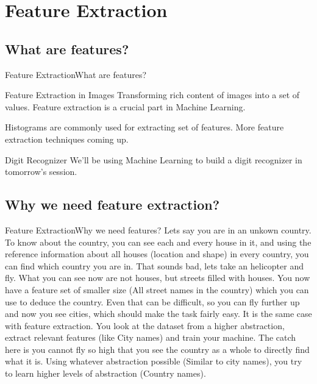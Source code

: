 \documentclass{beamer}
\begin{document}
\section{Feature Extraction}
\subsection{What are features?}
\begin{frame}{Feature Extraction}{What are features?}
\begin{block}{Feature Extraction in Images}
Transforming rich content of images into a set of values. Feature extraction is a crucial part in Machine Learning.
\end{block}
\pause
\begin{example}
Histograms are commonly used for extracting set of features. More feature extraction techniques coming up.
\end{example}

\pause
\begin{block}{Digit Recognizer}
We'll be using Machine Learning to build a digit recognizer in tomorrow's session. 
\end{block}

\end{frame}

\subsection{Why we need feature extraction?}
\begin{frame}{Feature Extraction}{Why we need features?}
Lets say you are in an unkown country. 
To know about the country, you can see each and every house in it, and using the reference information about all houses (location and shape) in every country, you can find which country you are in.
That sounds bad, lets take an helicopter and fly. What you can see now are not houses, but streets filled with houses. You now have a feature set of smaller size (All street names in the country) which you can use to deduce the country.
Even that can be difficult, so you can fly further up and now you see cities, which should make the task fairly easy.
It is the same case with feature extraction. You look at the dataset from a higher abstraction, extract relevant features (like City names) and train your machine.
The catch here is you cannot fly so high that you see the country as a whole to directly find what it is. Using whatever abstraction possible (Similar to city names), you try to learn higher levels of abstraction (Country names).
\end{frame}
\end{document}
